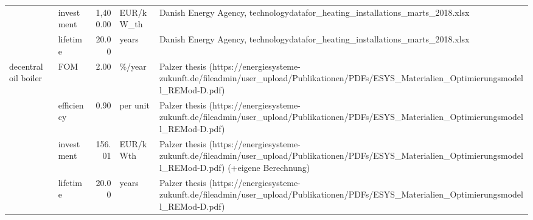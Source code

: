 \begin{longtable}{p{5cm}p{3cm}rp{3cm}p{11cm}}
                      & investment &       1,400.00 &                         EUR/kW\_th &                                                                                                                                                                                                                                                        Danish Energy Agency, technologydatafor\_heating\_installations\_marts\_2018.xlsx \\
                      & lifetime &          20.00 &                             years &                                                                                                                                                                                                                                                        Danish Energy Agency, technologydatafor\_heating\_installations\_marts\_2018.xlsx \\
decentral oil boiler & FOM &           2.00 &                            \%/year &                                                                                                                                                                                           Palzer thesis (https://energiesysteme-zukunft.de/fileadmin/user\_upload/Publikationen/PDFs/ESYS\_Materialien\_Optimierungsmodell\_REMod-D.pdf) \\
                      & efficiency &           0.90 &                          per unit &                                                                                                                                                                                           Palzer thesis (https://energiesysteme-zukunft.de/fileadmin/user\_upload/Publikationen/PDFs/ESYS\_Materialien\_Optimierungsmodell\_REMod-D.pdf) \\
                      & investment &         156.01 &                          EUR/kWth &                                                                                                                                                                      Palzer thesis (https://energiesysteme-zukunft.de/fileadmin/user\_upload/Publikationen/PDFs/ESYS\_Materialien\_Optimierungsmodell\_REMod-D.pdf) (+eigene Berechnung) \\
                      & lifetime &          20.00 &                             years &                                                                                                                                                                                           Palzer thesis (https://energiesysteme-zukunft.de/fileadmin/user\_upload/Publikationen/PDFs/ESYS\_Materialien\_Optimierungsmodell\_REMod-D.pdf) \\

\end{longtable}
